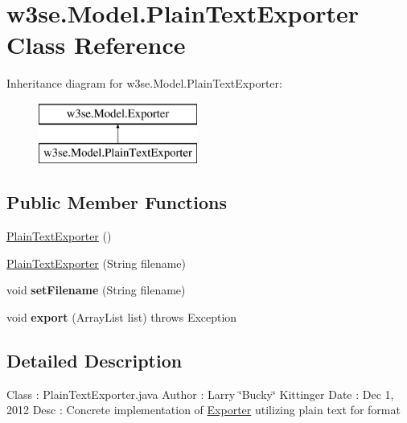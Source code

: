 \hypertarget{classw3se_1_1_model_1_1_plain_text_exporter}{\section{w3se.\-Model.\-Plain\-Text\-Exporter Class Reference}
\label{classw3se_1_1_model_1_1_plain_text_exporter}
}
Inheritance diagram for w3se.\-Model.\-Plain\-Text\-Exporter\-:\begin{figure}[H]
\begin{center}
\leavevmode
\includegraphics[height=2.000000cm]{classw3se_1_1_model_1_1_plain_text_exporter}
\end{center}
\end{figure}
\subsection*{Public Member Functions}
\begin{DoxyCompactItemize}
\item 
\hyperlink{classw3se_1_1_model_1_1_plain_text_exporter_a79ff10bf2f4a5aac39609fa8a02dfe59}{Plain\-Text\-Exporter} ()
\item 
\hyperlink{classw3se_1_1_model_1_1_plain_text_exporter_ad2fa7f7a267b647b56d72d076348b0d7}{Plain\-Text\-Exporter} (String filename)
\item 
\hypertarget{classw3se_1_1_model_1_1_plain_text_exporter_a873cd65e763c2a243913a467f41d2ec4}{void {\bfseries set\-Filename} (String filename)}\label{classw3se_1_1_model_1_1_plain_text_exporter_a873cd65e763c2a243913a467f41d2ec4}

\item 
\hypertarget{classw3se_1_1_model_1_1_plain_text_exporter_a89a999e2f4425123c102c49a3c85af59}{void {\bfseries export} (Array\-List list)  throws Exception 		}\label{classw3se_1_1_model_1_1_plain_text_exporter_a89a999e2f4425123c102c49a3c85af59}

\end{DoxyCompactItemize}


\subsection{Detailed Description}
Class \-: Plain\-Text\-Exporter.\-java Author \-: Larry \char`\"{}\-Bucky\char`\"{} Kittinger Date \-: Dec 1, 2012 Desc \-: Concrete implementation of \hyperlink{interfacew3se_1_1_model_1_1_exporter}{Exporter} utilizing plain text for format 

